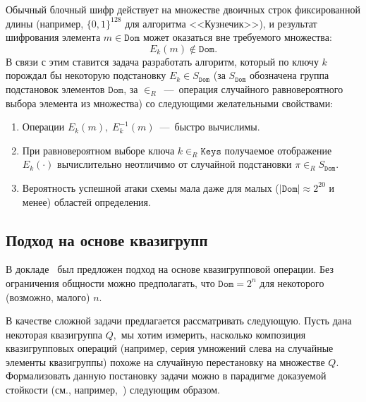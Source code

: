     Обычный блочный шифр действует на множестве двоичных строк фиксированной длины (например, $\{0, 1\}^{128}$ для алгоритма <<Кузнечик>>), и результат шифрования элемента $m \in \texttt{Dom}$ может оказаться вне требуемого множества: $$E_k(m) \not\in \texttt{Dom}.$$
    В связи с этим ставится задача разработать алгоритм, который по ключу $k$ порождал бы некоторую подстановку 
    $E_k \in S_{\texttt{Dom}}$ (за $S_{\texttt{Dom}}$ обозначена группа подстановок элементов $\texttt{Dom}$,  за $\in_R$~---~операция случайного равновероятного выбора элемента из множества) со следующими желательными свойствами:


    \begin{enumerate}
        \item Операции $E_k(m), \; E_k^{-1}(m)$~---~быстро вычислимы.
        \item При равновероятном выборе ключа $k \in_R \texttt{Keys}$ получаемое отображение $E_k(\cdot)$ вычислительно неотличимо от случайной подстановки ${\pi \in_R S_{\texttt{Dom}}.}$ 
        \item Вероятность успешной атаки схемы мала даже для малых ($|\texttt{Dom}| \approx 2^{20}$ и менее) областей определения.
    \end{enumerate}

\subsection{Подход на основе квазигрупп}
    В докладе~\cite{ctcrypt21} был предложен подход на основе квазигрупповой операции.
    Без ограничения общности можно предполагать, что $\texttt{Dom} = 2^n$ для некоторого (возможно, малого) $n.$

    В качестве сложной задачи предлагается рассматривать следующую.
    Пусть дана некоторая квазигруппа $Q,$ мы хотим измерить, насколько композиция квазигрупповых операций (например, серия умножений слева на случайные элементы квазигруппы) похоже на случайную перестановку на множестве $Q.$
    Формализовать данную постановку задачи можно в парадигме доказуемой стойкости (см., например,~\cite{katz2020introduction}) следующим образом.

